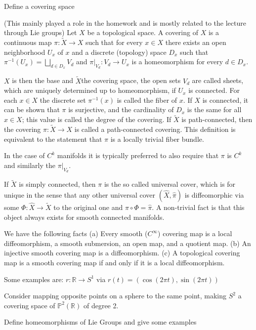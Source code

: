 Define a covering space

(This mainly played a role in the homework and is mostly related to the lecture through Lie groups)
Let \(X\) be a topological space. 
A covering of \(X\) is a continuous map \(\pi : \tilde{X} \rightarrow X\) such that for every \(x \in X\) there exists an open neighborhood \(U_x\) of \(x\) 
and a discrete (topology) space \(D_x\) such that 
\(\pi^{-1}(U_x)= \displaystyle \bigsqcup_{d \in D_x} V_d \) and 
\(\pi|_{V_d}:V_d \rightarrow U_x \) is a homeomorphism for every \(d \in D_x \).

\( X \) is then the base and \( \tilde{X} \)the covering space, the open sets \(V_{d}\) are called sheets, 
which are uniquely determined up to homeomorphism, if \(U_x\) is connected.
For each \(x \in X\) the discrete set \(\pi^{-1}(x)\) is called the fiber of \(x\). 
If \(X\) is connected, it can be shown that \(\pi\) is surjective, and the cardinality of \(D_x\) is the same for all \(x \in X\); 
this value is called the degree of the covering. 
If \(\tilde X\) is path-connected, then the covering \( \pi : \tilde X \rightarrow X\) is called a path-connected covering. 
This definition is equivalent to the statement that \(\pi\) is a locally trivial fiber bundle.

In the case of \( C^k \) manifolds it is typically preferred to also require that \( \pi \) is \( C^k \) and similarly the \( \pi|_{V_d} \).

If \( \tilde{X} \) is simply connected, then \( \pi \) is the so called universal cover, which is for unique in the sense
that any other universal cover \( (\hat{X}, \hat{\pi}) \) is diffeomorphic via some 
\( \Phi : \hat{X} \to \tilde{X} \) to the original one and \( \pi \circ \Phi  = \hat{\pi} \).
A non-trivial fact is that this object always exists for smooth connected manifolds.

We have the following facts
(a) Every smooth (\( C^\infty \)) covering map is a local diffeomorphism, a smooth submersion,
an open map, and a quotient map.
(b) An injective smooth covering map is a diffeomorphism.
(c) A topological covering map is a smooth covering map if and only if it is a local
diffeomorphism.

Some examples are:
\( r : \mathbb{R} \to S^1 \) via \( r(t) = (\cos(2\pi t), \sin(2\pi t)) \)

Consider mapping opposite points on a sphere to the same point, making \( S^2 \) a covering space of \( \mathbb{P}^2(\mathbb{R}) \)
of degree 2.


Define homeomorphisms of Lie Groups and give some examples


